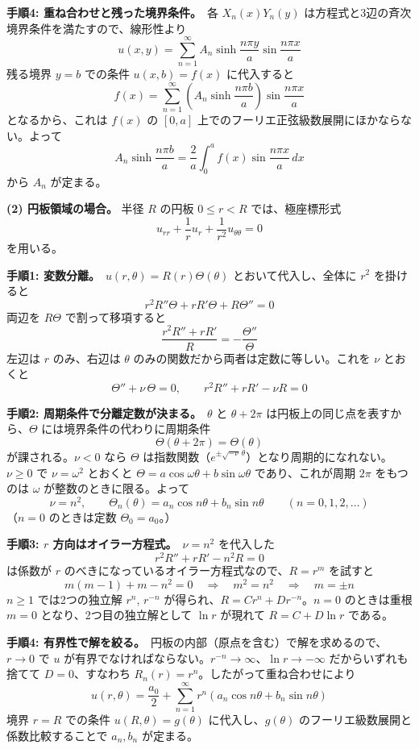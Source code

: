 \documentclass[a4paper,11pt]{article}
\begin{document}
\medskip\noindent
\textbf{手順4: 重ね合わせと残った境界条件。}\ 各 $X_n(x)Y_n(y)$ は方程式と3辺の斉次境界条件を満たすので、線形性より
\[
u(x,y) = \sum_{n=1}^{\infty} A_n \sinh\frac{n\pi y}{a} \sin\frac{n\pi x}{a}
\]
残る境界 $y = b$ での条件 $u(x,b) = f(x)$ に代入すると
\[
f(x) = \sum_{n=1}^{\infty} \left(A_n \sinh\frac{n\pi b}{a}\right) \sin\frac{n\pi x}{a}
\]
となるから、これは $f(x)$ の $[0,a]$ 上でのフーリエ正弦級数展開にほかならない。よって
\[
A_n \sinh\frac{n\pi b}{a} = \frac{2}{a}\int_0^{a} f(x)\sin\frac{n\pi x}{a}\,dx
\]
から $A_n$ が定まる。

\medskip
\noindent
\textbf{(2) 円板領域の場合。}
半径 $R$ の円板 $0 \le r < R$ では、極座標形式
\[
u_{rr} + \frac{1}{r}u_r + \frac{1}{r^2}u_{\theta\theta} = 0
\]
を用いる。

\medskip\noindent
\textbf{手順1: 変数分離。}\ $u(r,\theta) = R(r)\Theta(\theta)$ とおいて代入し、全体に $r^2$ を掛けると
\[
r^2 R'' \Theta + r R' \Theta + R \Theta'' = 0
\]
両辺を $R\Theta$ で割って移項すると
\[
\frac{r^2 R'' + r R'}{R} = -\frac{\Theta''}{\Theta}
\]
左辺は $r$ のみ、右辺は $\theta$ のみの関数だから両者は定数に等しい。これを $\nu$ とおくと
\[
\Theta'' + \nu\,\Theta = 0, \qquad r^2 R'' + rR' - \nu R = 0
\]

\medskip\noindent
\textbf{手順2: 周期条件で分離定数が決まる。}\ $\theta$ と $\theta + 2\pi$ は円板上の同じ点を表すから、$\Theta$ には境界条件の代わりに周期条件
\[
\Theta(\theta + 2\pi) = \Theta(\theta)
\]
が課される。$\nu < 0$ なら $\Theta$ は指数関数（$e^{\pm\sqrt{-\nu}\,\theta}$）となり周期的になれない。$\nu \ge 0$ で $\nu = \omega^2$ とおくと $\Theta = a\cos\omega\theta + b\sin\omega\theta$ であり、これが周期 $2\pi$ をもつのは $\omega$ が整数のときに限る。よって
\[
\nu = n^2, \qquad
\Theta_n(\theta) = a_n \cos n\theta + b_n \sin n\theta \qquad (n = 0, 1, 2, \dots)
\]
（$n=0$ のときは定数 $\Theta_0 = a_0$。）

\medskip\noindent
\textbf{手順3: $r$ 方向はオイラー方程式。}\ $\nu = n^2$ を代入した
\[
r^2 R'' + rR' - n^2 R = 0
\]
は係数が $r$ のべきになっているオイラー方程式なので、$R = r^m$ を試すと
\[
m(m-1) + m - n^2 = 0
\quad\Longrightarrow\quad
m^2 = n^2
\quad\Longrightarrow\quad
m = \pm n
\]
$n \ge 1$ では2つの独立解 $r^n$, $r^{-n}$ が得られ、$R = C r^{n} + D r^{-n}$。$n = 0$ のときは重根 $m = 0$ となり、2つ目の独立解として $\ln r$ が現れて $R = C + D\ln r$ である。

\medskip\noindent
\textbf{手順4: 有界性で解を絞る。}\ 円板の内部（原点を含む）で解を求めるので、$r \to 0$ で $u$ が有界でなければならない。$r^{-n} \to \infty$、$\ln r \to -\infty$ だからいずれも捨てて $D = 0$、すなわち $R_n(r) = r^n$。したがって重ね合わせにより
\[
u(r,\theta) = \frac{a_0}{2} + \sum_{n=1}^{\infty} r^{n}\left(a_n \cos n\theta + b_n \sin n\theta\right)
\]
境界 $r = R$ での条件 $u(R,\theta) = g(\theta)$ に代入し、$g(\theta)$ のフーリエ級数展開と係数比較することで $a_n, b_n$ が定まる。
\end{document}
